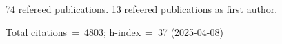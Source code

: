 74 refereed publications. 13 refeered publications as first author.

Total citations~=~4803; h-index~=~37 (2025-04-08)